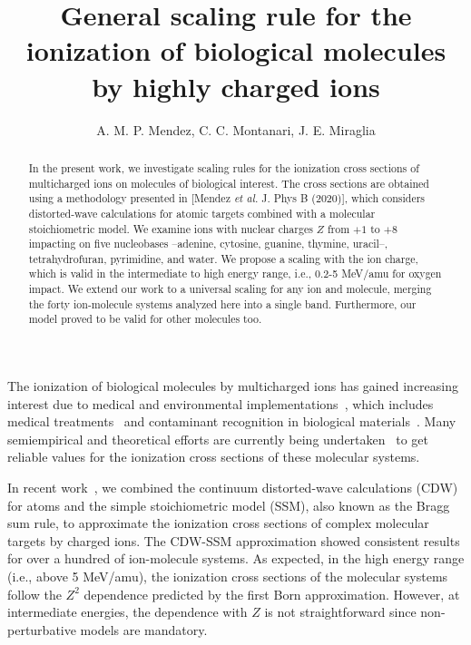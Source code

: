 \documentclass[10pt,showpacs,showkeys,twocolumn]{revtex4-1}
\begin{document}
\title[General scaling rule for the ionization of biological molecules]{
General scaling rule for the ionization of biological molecules \\ by 
highly charged ions}
\author{A. M. P. Mendez, C. C. Montanari, J. E. Miraglia}

\date{}%

\begin{abstract}
In the present work, we investigate scaling rules for the ionization 
cross sections of multicharged ions on molecules of biological interest. 
The cross sections are obtained using a methodology presented in 
[Mendez \textit{et al.} J. Phys B (2020)], which considers distorted-wave 
calculations for atomic targets combined with a molecular stoichiometric 
model. We examine ions with nuclear charges $Z$ from $+1$ to $+8$ 
impacting on five nucleobases --adenine, cytosine, guanine, thymine, 
uracil--, tetrahydrofuran, pyrimidine, and water. We propose a scaling 
with the ion charge, which is valid in the intermediate to high energy 
range, i.e., 0.2-5 MeV/amu for oxygen impact. We extend our work to a 
universal scaling for any ion and molecule, merging the forty 
ion-molecule systems analyzed here into a single band. Furthermore, our 
model proved to be valid for other molecules too.  
\end{abstract}


\maketitle
\linenumbers

The ionization of biological molecules by multicharged ions has gained 
increasing interest due to medical and environmental 
implementations~\cite{PhysMed}, which includes medical 
treatments~\cite{Mohamad2017,Solov2009,Denifl2011} and contaminant 
recognition in biological materials~\cite{water,ferrazdias}. 
Many semiempirical \citep{vera_prl2013} and theoretical efforts are 
currently being undertaken~\cite{MendezJPB20,Quinto20,ludde2019,ludde2018,
ludde2016,Champion2012} to get reliable values for the ionization cross 
sections of these molecular systems. 

In recent work~\cite{MendezJPB20}, we combined the continuum 
distorted-wave calculations (CDW) for atoms and the simple 
stoichiometric model (SSM), also known as the Bragg sum rule, to 
approximate the ionization cross sections of complex molecular targets 
by charged ions. The CDW-SSM approximation showed consistent results 
for over a hundred of ion-molecule systems. As expected, in the high 
energy range (i.e., above 5 MeV/amu), the ionization cross sections of
the molecular systems follow the $Z^2$ dependence predicted by the 
first Born approximation. However, at intermediate energies, the 
dependence with $Z$ is not straightforward since non-perturbative 
models are mandatory.
\end{document}
